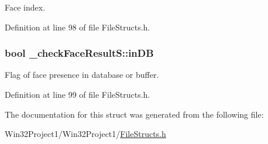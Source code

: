 Face index. 



Definition at line 98 of file File\+Structs.\+h.

\subsubsection[{\texorpdfstring{in\+DB}{inDB}}]{\setlength{\rightskip}{0pt plus 5cm}bool \+\_\+check\+Face\+Result\+S\+::in\+DB}\hypertarget{struct__check_face_result_s_aa7353d6109af6ce0a9b2c8c07e09a48b}{}\label{struct__check_face_result_s_aa7353d6109af6ce0a9b2c8c07e09a48b}


Flag of face presence in database or buffer. 



Definition at line 99 of file File\+Structs.\+h.



The documentation for this struct was generated from the following file\+:\begin{DoxyCompactItemize}
\item 
Win32\+Project1/\+Win32\+Project1/\hyperlink{_file_structs_8h}{File\+Structs.\+h}\end{DoxyCompactItemize}
